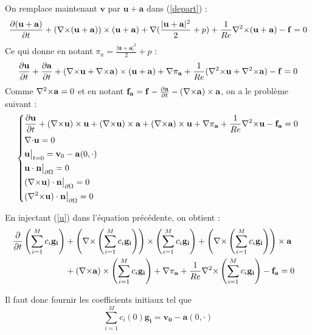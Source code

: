 On remplace maintenant $\mathbf{v}$ par $\mathbf{u}+\mathbf{a}$ dans (\ref{depart}) :
\[ \frac{\partial(\mathbf{u}+\mathbf{a})}{\partial t}+({\nabla\times}(\mathbf{u}+\mathbf{a}))\times(\mathbf{u}+\mathbf{a}) + {\nabla} (\frac{|\mathbf{u}+\mathbf{a}|^2}{2}+p) + \frac{1}{Re}{\nabla^2\times}(\mathbf{u}+\mathbf{a}) - \mathbf{f} = 0 \]
Ce qui donne en notant $\pi_a=\frac{|\mathbf{u}+\mathbf{a}|^2}{2}+p$ :
\[ \frac{\partial \mathbf{u}}{\partial t}+\frac{\partial \mathbf{a}}{\partial t} + ({\nabla\times} \mathbf{u}+{\nabla\times} \mathbf{a})\times(\mathbf{u}+\mathbf{a}) + {\nabla}\pi_{\mathbf{a}} + \frac{1}{Re}({\nabla^2\times} \mathbf{u}+{\nabla^2\times} \mathbf{a}) - \mathbf{f} = 0 \]
Comme ${\nabla^2\times} \mathbf{a} = 0$ et en notant $\mathbf{f_a}=\mathbf{f}-\frac{\partial \mathbf{a}}{\partial t} - ({\nabla\times} \mathbf{a})\times \mathbf{a}$, on a le problème suivant :
\begin{equation}\label{pbu}
\left\{\begin{aligned}
&\frac{\partial \mathbf{u}}{\partial t} + ({\nabla\times} \mathbf{u})\times \mathbf{u} + ({\nabla\times} \mathbf{u})\times \mathbf{a} +({\nabla\times} \mathbf{a})\times \mathbf{u} + {\nabla} \pi_{\mathbf{a}} +\frac{1}{Re}{\nabla^2\times}  \mathbf{u} - \mathbf{f_a} = 0\\
&{\nabla\cdot} \mathbf{u} = 0\\
&\mathbf{u}\big\rvert_{t=0} = \mathbf{v}_0 - \mathbf{a}(0,\cdot)\\
&\mathbf{u}\cdot \mathbf{n}{\big\rvert_{\partial\Omega}} = 0\\
&({\nabla\times} \mathbf{u})\cdot \mathbf{n}{\big\rvert_{\partial\Omega}} = 0\\
&({\nabla^2\times}  \mathbf{u})\cdot \mathbf{n}{\big\rvert_{\partial\Omega}} = 0
\end{aligned}\right.
\end{equation}

En injectant (\ref{u}) dans l'équation précédente, on obtient :
\begin{equation}\label{pbc}
\begin{aligned}
\frac{\partial}{\partial t}\left(\sum_{i=1}^M c_i\mathbf{g_i}\right) &+ \left({\nabla\times} \left(\sum_{i=1}^Mc_i\mathbf{g_i}\right)\right)\times \left(\sum_{i=1}^Mc_i\mathbf{g_i}\right) + \left({\nabla\times} \left(\sum_{i=1}^Mc_i\mathbf{g_i}\right)\right)\times \mathbf{a}&\\
&+ ({\nabla\times} \mathbf{a})\times \left(\sum_{i=1}^Mc_i\mathbf{g_i}\right) + {\nabla} \pi_{\mathbf{a}} +\frac{1}{Re}{\nabla^2\times}  \left(\sum_{i=1}^Mc_i\mathbf{g_i}\right) - \mathbf{f_a} =0\\
\end{aligned}\end{equation} 

Il faut donc fournir les coefficients initiaux tel que 
\[ \sum_{i=1}^M c_i(0)\mathbf{g_i} = \mathbf{v_0}-\mathbf{a}(0,\cdot) \]

